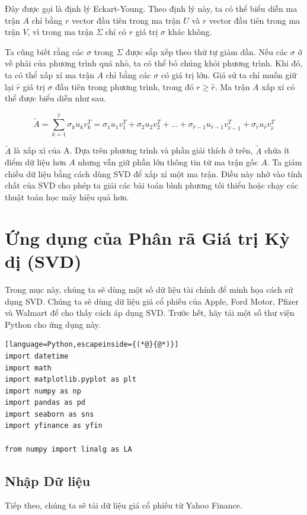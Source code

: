 Đây được gọi là định lý Eckart-Young. Theo định lý này, ta có thể biểu diễn ma trận $A$ chỉ bằng $r$ vector đầu tiên trong ma trận $U$ và $r$ vector đầu tiên trong ma trận $V$, vì trong ma trận $\Sigma$ chỉ có $r$ giá trị $\sigma$ khác không.

Ta cũng biết rằng các $\sigma$ trong $\Sigma$ được sắp xếp theo thứ tự giảm dần. Nếu các $\sigma$ ở vế phải của phương trình quá nhỏ, ta có thể bỏ chúng khỏi phương trình. Khi đó, ta có thể xấp xỉ ma trận $A$ chỉ bằng các $\sigma$ có giá trị lớn. Giả sử ta chỉ muốn giữ lại $\hat{r}$ giá trị $\sigma$ đầu tiên trong phương trình, trong đó $r \ge \hat{r}$. Ma trận $A$ xấp xỉ có thể được biểu diễn như sau.

\[
\tilde{A}=\sum_{k=1}^{\hat{r}}\sigma_{k}u_{k}v_{k}^{T}=\sigma_{1}u_{1}v_{1}^{T}+\sigma_{2}u_{2}v_{2}^{T}+...+\sigma_{\hat{r}-1}u_{\hat{r}-1}v_{\hat{r}-1}^{T}+\sigma_{\hat{r}}u_{\hat{r}}v_{\hat{r}}^{T}
\]

$\tilde{A}$ là xấp xỉ của A. Dựa trên phương trình và phần giải thích ở trên, $\tilde{A}$ chứa ít điểm dữ liệu hơn $A$ nhưng vẫn giữ phần lớn thông tin từ ma trận gốc $A$. Ta giảm chiều dữ liệu bằng cách dùng SVD để xấp xỉ một ma trận. Điều này nhờ vào tính chất của SVD cho phép ta giải các bài toán bình phương tối thiểu hoặc chạy các thuật toán học máy hiệu quả hơn.

\section{Ứng dụng của Phân rã Giá trị Kỳ dị (SVD)}

Trong mục này, chúng ta sẽ dùng một số dữ liệu tài chính để minh họa cách sử dụng SVD. Chúng ta sẽ dùng dữ liệu giá cổ phiếu của Apple, Ford Motor, Pfizer và Walmart để cho thấy cách áp dụng SVD. Trước hết, hãy tải một số thư viện Python cho ứng dụng này.

\begin{lstlisting}[language=Python,escapeinside={(*@}{@*)}]
import datetime
import math
import matplotlib.pyplot as plt
import numpy as np
import pandas as pd
import seaborn as sns
import yfinance as yfin

from numpy import linalg as LA
\end{lstlisting}

\subsection{Nhập Dữ liệu}

Tiếp theo, chúng ta sẽ tải dữ liệu giá cổ phiếu từ Yahoo Finance.

